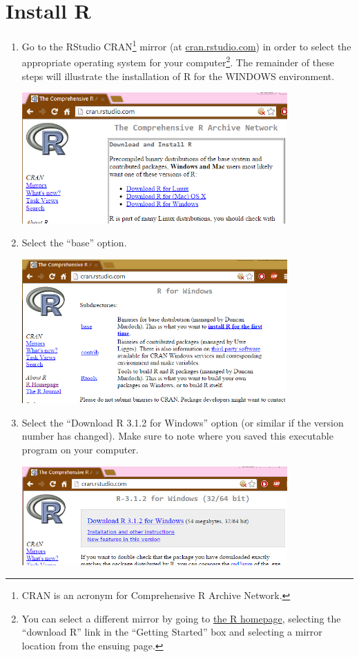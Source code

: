 \documentclass{article}\usepackage[]{graphicx}\usepackage[]{color}
\begin{document}
\section{Install R}
\begin{enumerate}
  \item Go to the RStudio CRAN\footnote{CRAN is an acronym for Comprehensive R Archive Network.} mirror (at \href{http://cran.rstudio.com/}{cran.rstudio.com}) in order to select the appropriate operating system for your computer\footnote{You can select a different mirror by going to \href{http://www.r-project.org/}{the R homepage}, selecting the ``download R'' link in the ``Getting Started'' box and selecting a mirror location from the ensuing page.}.  The remainder of these steps will illustrate the installation of R for the WINDOWS environment.
\begin{center}
  \includegraphics[width=4in]{Figs/R_Install_ChooseOS.png}
\end{center}

  \item Select the ``base'' option.
\begin{center}
  \includegraphics[width=4in]{Figs/R_Install_ChooseBase.png}
\end{center}

  \item Select the ``Download R 3.1.2 for Windows'' option (or similar if the version number has changed).  Make sure to note where you saved this executable program on your computer.
\begin{center}
  \includegraphics[width=4in]{Figs/R_Install_Download.png}
\end{center}


\end{enumerate}
\end{document}
